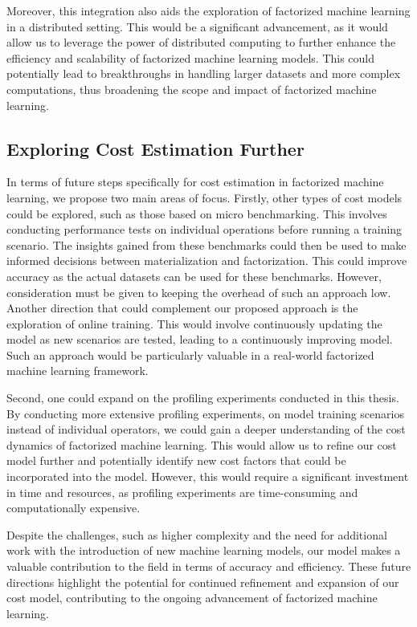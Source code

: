 Moreover, this integration also aids the exploration of factorized machine learning in a distributed setting. This would be a significant advancement, as it would allow us to leverage the power of distributed computing to further enhance the efficiency and scalability of factorized machine learning models. This could potentially lead to breakthroughs in handling larger datasets and more complex computations, thus broadening the scope and impact of factorized machine learning.

\subsection{Exploring Cost Estimation Further}
In terms of future steps specifically for cost estimation in factorized machine learning, we propose two main areas of focus. Firstly, other types of cost models could be explored, such as those based on micro benchmarking. This involves conducting performance tests on individual operations before running a training scenario. The insights gained from these benchmarks could then be used to make informed decisions between materialization and factorization. This could improve accuracy as the actual datasets can be used for these benchmarks. However, consideration must be given to keeping the overhead of such an approach low. Another direction that could complement our proposed approach is the exploration of online training. This would involve continuously updating the model as new scenarios are tested, leading to a continuously improving model. Such an approach would be particularly valuable in a real-world factorized machine learning framework.

Second, one could expand on the profiling experiments conducted in this thesis. By conducting more extensive profiling experiments, on model training scenarios instead of individual operators, we could gain a deeper understanding of the cost dynamics of factorized machine learning. This would allow us to refine our cost model further and potentially identify new cost factors that could be incorporated into the model. However, this would require a significant investment in time and resources, as profiling experiments are time-consuming and computationally expensive.

Despite the challenges, such as higher complexity and the need for additional work with the introduction of new machine learning models, our model makes a valuable contribution to the field in terms of accuracy and efficiency. These future directions highlight the potential for continued refinement and expansion of our cost model, contributing to the ongoing advancement of factorized machine learning.